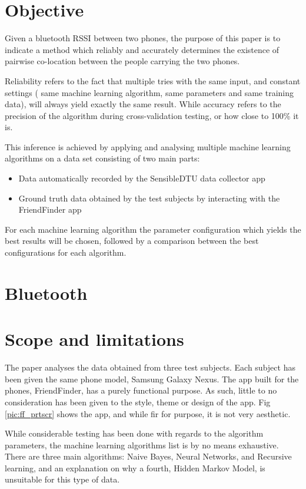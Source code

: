  
\section{Objective}

Given a bluetooth RSSI between two phones, the purpose of this paper is to indicate a method which reliably and accurately determines the existence of pairwise co-location between the people carrying the two phones.

Reliability refers to the fact that multiple tries with the same input, and constant settings ( same machine learning algorithm, same parameters and same training data), will always yield exactly the same result. While accuracy refers to the precision of the algorithm during cross-validation testing, or how close to 100\% it is. 
 
This inference is achieved by applying and analysing multiple machine learning algorithms on a data set consisting of two main parts:
\begin{itemize}
  \item Data automatically recorded by the SensibleDTU data collector app \cite{Stopczynski}
  \item Ground truth data obtained by the test subjects by interacting with the FriendFinder app
\end{itemize}

For each machine learning algorithm the parameter configuration which yields the best results will be chosen, followed by a comparison between the best configurations for each algorithm.      

\section{Bluetooth}

\section{Scope and limitations}

The paper analyses the data obtained from three test subjects. Each subject has been given the same phone model, Samsung Galaxy Nexus. The app built for the phones, FriendFinder, has a purely functional purpose. As such, little to no consideration has been given to the style, theme or design of the app. Fig \ref{pic:ff_prtscr} shows the app, and while fir for purpose, it is not very aesthetic.

While considerable testing has been done with regards to the algorithm parameters, the machine learning algorithms list is by no means exhaustive. There are three main algorithms: Naive Bayes, Neural Networks, and Recursive learning, and an explanation on why a fourth, Hidden Markov Model, is unsuitable for this type of data. 

